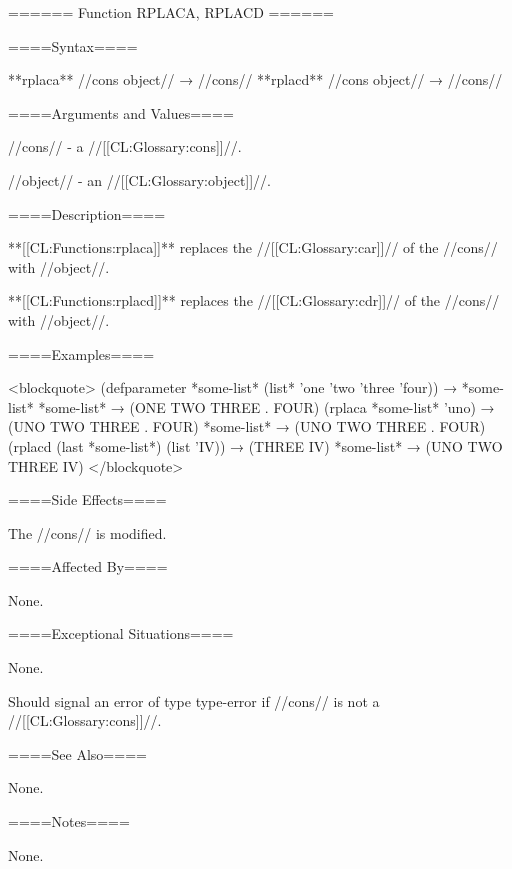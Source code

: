 ====== Function RPLACA, RPLACD ======

====Syntax====

**{rplaca}** //cons object// → //cons// **{rplacd}** //cons object// → //cons//

====Arguments and Values====

//cons// - a //[[CL:Glossary:cons]]//.

//object// - an //[[CL:Glossary:object]]//.

====Description====

**[[CL:Functions:rplaca]]** replaces the //[[CL:Glossary:car]]// of the //cons// with //object//.

**[[CL:Functions:rplacd]]** replaces the //[[CL:Glossary:cdr]]// of the //cons// with //object//.

====Examples====

<blockquote> (defparameter *some-list* (list* 'one 'two 'three 'four)) → *some-list* *some-list* → (ONE TWO THREE . FOUR) (rplaca *some-list* 'uno) → (UNO TWO THREE . FOUR) *some-list* → (UNO TWO THREE . FOUR) (rplacd (last *some-list*) (list 'IV)) → (THREE IV) *some-list* → (UNO TWO THREE IV) </blockquote>

====Side Effects====


The //cons// is modified.

====Affected By====

None.

====Exceptional Situations====

None.

Should signal an error of type type-error if //cons// is not a //[[CL:Glossary:cons]]//.

====See Also====

None.

====Notes====

None.

